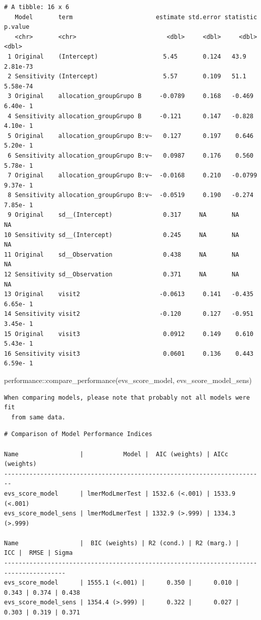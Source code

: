 \documentclass[
  letterpaper,
  DIV=11,
  numbers=noendperiod]{scrartcl}
\newenvironment{Shaded}{\begin{snugshade}}{\end{snugshade}}
\newcommand{\FunctionTok}[1]{\textcolor[rgb]{0.28,0.35,0.67}{#1}}
\newcommand{\NormalTok}[1]{\textcolor[rgb]{0.00,0.23,0.31}{#1}}
\newcommand{\SpecialCharTok}[1]{\textcolor[rgb]{0.37,0.37,0.37}{#1}}
\begin{document}
\begin{verbatim}
# A tibble: 16 x 6
   Model       term                       estimate std.error statistic   p.value
   <chr>       <chr>                         <dbl>     <dbl>     <dbl>     <dbl>
 1 Original    (Intercept)                  5.45       0.124   43.9     2.81e-73
 2 Sensitivity (Intercept)                  5.57       0.109   51.1     5.58e-74
 3 Original    allocation_groupGrupo B     -0.0789     0.168   -0.469   6.40e- 1
 4 Sensitivity allocation_groupGrupo B     -0.121      0.147   -0.828   4.10e- 1
 5 Original    allocation_groupGrupo B:v~   0.127      0.197    0.646   5.20e- 1
 6 Sensitivity allocation_groupGrupo B:v~   0.0987     0.176    0.560   5.78e- 1
 7 Original    allocation_groupGrupo B:v~  -0.0168     0.210   -0.0799  9.37e- 1
 8 Sensitivity allocation_groupGrupo B:v~  -0.0519     0.190   -0.274   7.85e- 1
 9 Original    sd__(Intercept)              0.317     NA       NA      NA       
10 Sensitivity sd__(Intercept)              0.245     NA       NA      NA       
11 Original    sd__Observation              0.438     NA       NA      NA       
12 Sensitivity sd__Observation              0.371     NA       NA      NA       
13 Original    visit2                      -0.0613     0.141   -0.435   6.65e- 1
14 Sensitivity visit2                      -0.120      0.127   -0.951   3.45e- 1
15 Original    visit3                       0.0912     0.149    0.610   5.43e- 1
16 Sensitivity visit3                       0.0601     0.136    0.443   6.59e- 1
\end{verbatim}

\begin{Shaded}
\begin{Highlighting}[]
\NormalTok{performance}\SpecialCharTok{::}\FunctionTok{compare\_performance}\NormalTok{(evs\_score\_model, evs\_score\_model\_sens)}
\end{Highlighting}
\end{Shaded}

\begin{verbatim}
When comparing models, please note that probably not all models were fit
  from same data.
\end{verbatim}

\begin{verbatim}
# Comparison of Model Performance Indices

Name                 |           Model |  AIC (weights) | AICc (weights)
------------------------------------------------------------------------
evs_score_model      | lmerModLmerTest | 1532.6 (<.001) | 1533.9 (<.001)
evs_score_model_sens | lmerModLmerTest | 1332.9 (>.999) | 1334.3 (>.999)

Name                 |  BIC (weights) | R2 (cond.) | R2 (marg.) |   ICC |  RMSE | Sigma
---------------------------------------------------------------------------------------
evs_score_model      | 1555.1 (<.001) |      0.350 |      0.010 | 0.343 | 0.374 | 0.438
evs_score_model_sens | 1354.4 (>.999) |      0.322 |      0.027 | 0.303 | 0.319 | 0.371
\end{verbatim}
\end{document}
